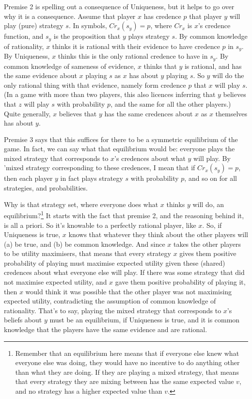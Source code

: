 \documentclass[
  11pt,
]{article}
\begin{document}
Premise 2 is spelling out a consequence of Uniqueness, but it helps to go over why it is a consequence. Assume that player \(x\) has credence \(p\) that player \(y\) will play (pure) strategy \(s\). In symbols, \(Cr_x(s_y) = p\), where \(Cr_x\) is \(x\)'s credence function, and \(s_y\) is the proposition that \(y\) plays strategy \(s\). By common knowledge of rationality, \(x\) thinks it is rational with their evidence to have credence \(p\) in \(s_y\). By Uniqueness, \(x\) thinks this is the only rational credence to have in \(s_y\). By common knowledge of sameness of evidence, \(x\) thinks that \(y\) is rational, and has the same evidence about \(x\) playing \(s\) as \(x\) has about \(y\) playing \(s\). So \(y\) will do the only rational thing with that evidence, namely form credence \(p\) that \(x\) will play \(s\). (In a game with more than two players, this also licences inferring that \(y\) believes that \(z\) will play \(s\) with probability \(p\), and the same for all the other players.) Quite generally, \(x\) believes that \(y\) has the same credences about \(x\) as \(x\) themselves has about \(y\).

Premise 3 says that this suffices for there to be a symmetric equilibrium of the game. In fact, we can say what that equilibrium would be: everyone plays the mixed strategy that corresponds to \(x\)'s credences about what \(y\) will play. By 'mixed strategy corresponding to these credences, I mean that if \(Cr_x(s_y) = p\), then each player \(y\) in fact plays strategy \(s\) with probability \(p\), and so on for all strategies, and probabilities.

Why is that strategy set, where everyone does what \(x\) thinks \(y\) will do, an equilibrium?\footnote{Remember that an equilibrium here means that if everyone else knew what everyone else was doing, they would have no incentive to do anything other than what they are doing. If they are playing a mixed strategy, that means that every strategy they are mixing between has the same expected value \(v\), and no strategy has a higher expected value than \(v\).} It starts with the fact that premise 2, and the reasoning behind it, is all a priori. So it's knowable to a perfectly rational player, like \(x\). So, if Uniqueness is true, \(x\) knows that whatever they think about the other players will (a) be true, and (b) be common knowledge. And since \(x\) takes the other players to be utility maximisers, that means that every strategy \(x\) gives them positive probability of playing must maximise expected utility given these (shared) credences about what everyone else will play. If there was some strategy that did not maximise expected utility, and \(x\) gave them positive probability of playing it, then \(x\) would think it was possible that the other player was not maximising expected utility, contradicting the assumption of common knowledge of rationality. That's to say, playing the mixed strategy that corresponds to \(x\)'s beliefs about \(y\) must be an equilibrium, if Uniqueness is true, and it is common knowledge that the players have the same evidence and are rational.
\end{document}
